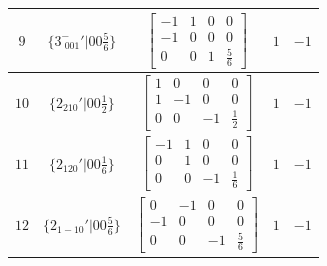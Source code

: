 \documentclass[fleqn,8pt]{jsarticle}
\begin{document}
\begin{longtable}{ccccc}
$ 9 $ & $ \{3^{-}_{\,\,001}{}'|0 0 \frac{5}{6}\} $ & $ \begin{bmatrix} -1 & 1 & 0 & 0 \\ -1 & 0 & 0 & 0 \\ 0 & 0 & 1 & \frac{5}{6} \end{bmatrix} $ & $ 1 $ & $ -1 $ \\ \hline
$ 10 $ & $ \{2{}_{210}{}'|0 0 \frac{1}{2}\} $ & $ \begin{bmatrix} 1 & 0 & 0 & 0 \\ 1 & -1 & 0 & 0 \\ 0 & 0 & -1 & \frac{1}{2} \end{bmatrix} $ & $ 1 $ & $ -1 $ \\ \hline
$ 11 $ & $ \{2{}_{120}{}'|0 0 \frac{1}{6}\} $ & $ \begin{bmatrix} -1 & 1 & 0 & 0 \\ 0 & 1 & 0 & 0 \\ 0 & 0 & -1 & \frac{1}{6} \end{bmatrix} $ & $ 1 $ & $ -1 $ \\ \hline
$ 12 $ & $ \{2{}_{1-10}{}'|0 0 \frac{5}{6}\} $ & $ \begin{bmatrix} 0 & -1 & 0 & 0 \\ -1 & 0 & 0 & 0 \\ 0 & 0 & -1 & \frac{5}{6} \end{bmatrix} $ & $ 1 $ & $ -1 $ \\
\end{longtable}
\end{document}
